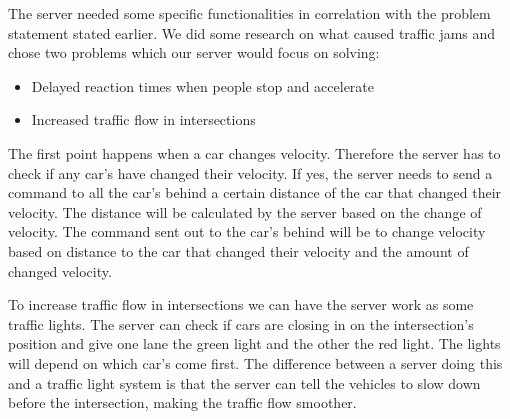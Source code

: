 The server needed some specific functionalities in correlation with the problem statement stated earlier. We did some research on what caused traffic jams and chose two problems which our server would focus on solving:

\begin{itemize}
	\item Delayed reaction times when people stop and accelerate 
	\item Increased traffic flow in intersections
\end{itemize}

The first point happens when a car changes velocity. Therefore the server has to check if any car’s have changed their velocity. If yes, the server needs to send a command to all the car’s behind a certain distance of the car that changed their velocity.  The distance will be calculated by the server based on the change of velocity. The command sent out to the car’s behind will be to change velocity based on distance to the car that changed their velocity and the amount of changed velocity.

To increase traffic flow in intersections we can have the server work as some traffic lights. The server can check if cars are closing in on the intersection’s position and give one lane the green light and the other the red light. The lights will depend on which car’s come first. The difference between a server doing this and a traffic light system is that the server can tell the vehicles to slow down before the intersection, making the traffic flow smoother.
